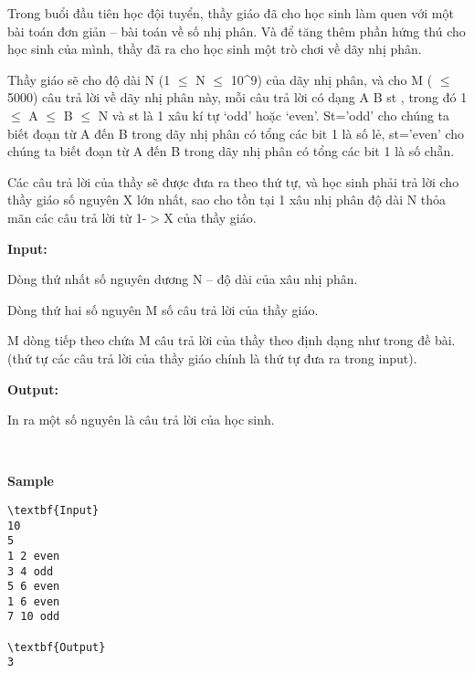 

Trong buổi đầu tiên học đội tuyển, thầy giáo đã cho học sinh làm quen với một bài toán đơn giản – bài toán về số nhị phân. Và để tăng thêm phần hứng thú cho học sinh của mình, thầy đã ra cho học sinh một trò chơi về dãy nhị phân.

Thầy giáo sẽ cho độ dài N (1 $\le$ N $\le$ 10^9) của dãy nhị phân, và cho M ( $\le$ 5000) câu trả lời về dãy nhị phân này, mỗi câu trả lời có dạng A B st , trong đó 1 $\le$ A $\le$ B $\le$ N và st là 1 xâu kí tự ‘odd’ hoặc ‘even’. St=’odd’ cho chúng ta biết đoạn từ A đến B trong dãy nhị phân có tổng các bit 1 là số lẻ, st=’even’ cho chúng ta biết đoạn từ A đến B trong dãy nhị phân có tổng các bit 1 là số chẵn.

Các câu trả lời của thầy sẽ được đưa ra theo thứ tự, và học sinh phải trả lời cho thầy giáo số nguyên X lớn nhất, sao cho tồn tại 1 xâu nhị phân độ dài N thỏa mãn các câu trả lời từ 1-$>$X của thầy giáo.

\textbf{Input:}

Dòng thứ nhất số nguyên dương N – độ dài của xâu nhị phân.

Dòng thứ hai số nguyên M số câu trả lời của thầy giáo.

M dòng tiếp theo chứa M câu trả lời của thầy theo định dạng như trong đề bài. (thứ tự các câu trả lời của thầy giáo chính là thứ tự đưa ra trong input).

\textbf{Output:}

In ra một số nguyên là câu trả lời của học sinh.

 

\textbf{Sample}
\begin{verbatim}
\textbf{Input}
10
5
1 2 even
3 4 odd
5 6 even
1 6 even
7 10 odd

\textbf{Output}
3\end{verbatim}
